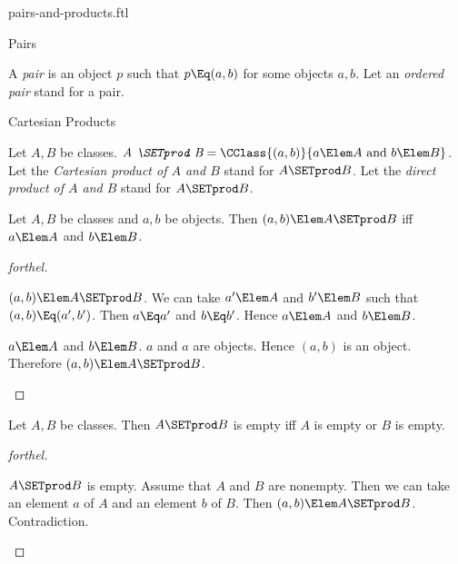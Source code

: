 \documentclass{stex}
\begin{document}
\begin{smodule}{pairs-and-products.ftl}

\begin{sfragment}{Pairs}
  \begin{definition}[forthel,for=ordered pair]
    A \emph{pair} is an object $p$ such that $p \Eq (a, b)$ for some objects $a, b$.
    Let an \emph{ordered pair} stand for a pair.
  \end{definition}
\end{sfragment}

\begin{sfragment}{Cartesian Products}
  \begin{definition}[forthel,for={SETprod,Cartesian product,direct product}]
    Let $A, B$ be classes.
    $\emph{A \SETprod B} = \CClass{(a, b)}{a \Elem A\text{ and }b \Elem B}$.
    Let the \emph{Cartesian product of $A$ and $B$} stand for $A \SETprod B$.
    Let the \emph{direct product of $A$ and $B$} stand for $A \SETprod B$.
  \end{definition}

  \begin{proposition}[forthel]
    Let $A, B$ be classes and $a, b$ be objects.
    Then $(a, b) \Elem A \SETprod B$ iff $a \Elem A$ and $b \Elem B$.
  \end{proposition}
  \begin{proof}[forthel]
    \begin{case}{$(a, b) \Elem A \SETprod B$.}
      We can take $a' \Elem A$ and $b' \Elem B$ such that $(a, b) \Eq (a', b')$.
      Then $a \Eq a'$ and $b \Eq b'$.
      Hence $a \Elem A$ and $b \Elem B$.
    \end{case}

    \begin{case}{$a \Elem A$ and $b \Elem B$.}
      $a$ and $a$ are objects.
      Hence $(a, b)$ is an object.
      Therefore $(a, b) \Elem A \SETprod B$.
    \end{case}
  \end{proof}

  \begin{proposition}[forthel]
    Let $A, B$ be classes.
    Then $A \SETprod B$ is empty iff $A$ is empty or $B$ is empty.
  \end{proposition}
  \begin{proof}[forthel]
    \begin{case}{$A \SETprod B$ is empty.}
      Assume that $A$ and $B$ are nonempty.
      Then we can take an element $a$ of $A$ and an element $b$ of $B$.
      Then $(a, b) \Elem A \SETprod B$.
      Contradiction.
    \end{case}


\end{proof}
\end{sfragment}
\end{smodule}
\end{document}
